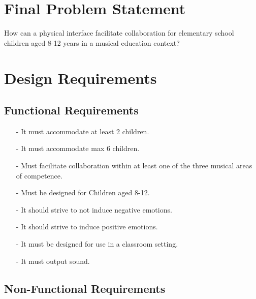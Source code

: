 

\section{Final Problem Statement}\label{sec:FPS}
	How can a physical interface facilitate collaboration for elementary school children aged 8-12 years in a musical education context?
	
\section{Design Requirements}
	\subsection*{Functional Requirements}
		\begin{itemize}
			\item[-] It must accommodate at least 2 children.\\
			\item[-] It must accommodate max 6 children.\\
			\item[-] Must facilitate collaboration within at least one of the three musical areas of competence.\\
			\item[-] Must be designed for Children aged 8-12.\\
			\item[-] It should strive to not induce  negative emotions.\\
			\item[-] It should strive to induce positive emotions.\\
			\item[-] It must be designed for use in a classroom setting.\\
			\item[-] It must output sound.		
			
		\end{itemize}
	\subsection*{Non-Functional Requirements}
		
	
















		